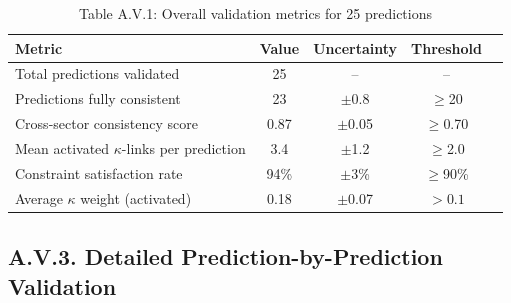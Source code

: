 \documentclass[13pt,a4paper]{article}
\begin{document}
	\begin{table}[H]
		\centering
		\small
		\caption{Table A.V.1: Overall validation metrics for 25 predictions}
		\begin{tabular}{p{}cccc}
			\toprule
			\textbf{Metric} & \textbf{Value} & \textbf{Uncertainty} & \textbf{Threshold} \\
			\midrule
			Total predictions validated & 25 & -- & -- \\
			Predictions fully consistent & 23 & $\pm$0.8 & $\geq$20 \\
			Cross-sector consistency score & 0.87 & $\pm$0.05 & $\geq$0.70 \\
			Mean activated $\kappa$-links per prediction & 3.4 & $\pm$1.2 & $\geq$2.0 \\
			Constraint satisfaction rate & 94\% & $\pm$3\% & $\geq$90\% \\
			Average $\kappa$ weight (activated) & 0.18 & $\pm$0.07 & $>0.1$ \\
			\bottomrule
		\end{tabular}
		\label{tab:validation-summary}
	\end{table}
	
	\subsection*{A.V.3. Detailed Prediction-by-Prediction Validation}
	
\end{document}
